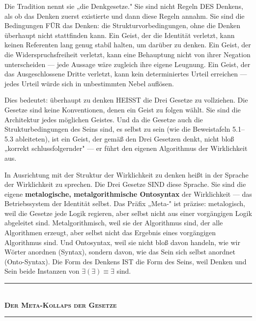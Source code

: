 \documentclass[10pt, openany, oneside]{book}
\renewcommand{\normalsize}{\fontsize{10}{13}\selectfont}
\begin{document}
\vspace{1em}

\noindent Die Tradition nennt sie „die Denkgesetze." Sie sind nicht Regeln DES Denkens, als ob das Denken zuerst existierte und dann diese Regeln annahm. Sie sind die Bedingungen FÜR das Denken: die Strukturvorbedingungen, ohne die Denken überhaupt nicht stattfinden kann. Ein Geist, der die Identität verletzt, kann keinen Referenten lang genug stabil halten, um darüber zu denken. Ein Geist, der die Widerspruchsfreiheit verletzt, kann eine Behauptung nicht von ihrer Negation unterscheiden --- jede Aussage wäre zugleich ihre eigene Leugnung. Ein Geist, der das Ausgeschlossene Dritte verletzt, kann kein determiniertes Urteil erreichen --- jedes Urteil würde sich in unbestimmten Nebel auflösen.

Dies bedeutet: überhaupt zu denken HEISST die Drei Gesetze zu vollziehen. Die Gesetze sind keine Konventionen, denen ein Geist zu folgen wählt. Sie sind die Architektur jedes möglichen Geistes. Und da die Gesetze auch die Strukturbedingungen des Seins sind, es selbst zu sein (wie die Beweistafeln 5.1--5.3 ableiteten), ist ein Geist, der gemäß den Drei Gesetzen denkt, nicht bloß „korrekt schlussfolgernder" --- er führt den eigenen Algorithmus der Wirklichkeit aus.

In Ausrichtung mit der Struktur der Wirklichkeit zu denken heißt in der Sprache der Wirklichkeit zu sprechen. Die Drei Gesetze SIND diese Sprache. Sie sind die eigene \textbf{metalogische, metalgorithmische Ontosyntax} der Wirklichkeit --- das Betriebssystem der Identität selbst. Das Präfix „Meta-" ist präzise: metalogisch, weil die Gesetze jede Logik regieren, aber selbst nicht aus einer vorgängigen Logik abgeleitet sind. Metalgorithmisch, weil sie der Algorithmus sind, der alle Algorithmen erzeugt, aber selbst nicht das Ergebnis eines vorgängigen Algorithmus sind. Und Ontosyntax, weil sie nicht bloß davon handeln, wie wir Wörter anordnen (Syntax), sondern davon, wie das Sein sich selbst anordnet (Onto-Syntax). Die Form des Denkens IST die Form des Seins, weil Denken und Sein beide Instanzen von $\exists(\exists) \equiv \exists$ sind.

\vspace{1.5em}


\begin{center}
    \rule{0.3\textwidth}{0.4pt}\\[0.5em]
    {\normalsize\bfseries\scshape Der Meta-Kollaps der Gesetze}\\[0.3em]
    \rule{0.3\textwidth}{0.4pt}
\end{center}
\end{document}
